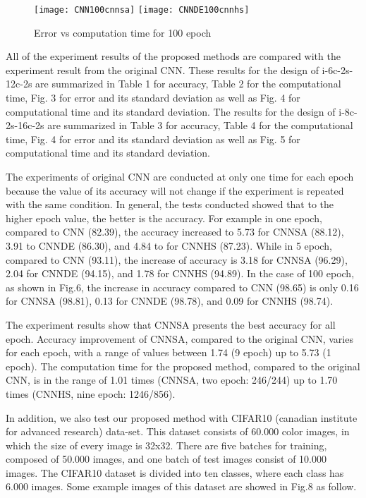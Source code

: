 \documentclass[10pt,letterpaper]{article}
\begin{document}
\begin{figure}
    \texttt{[image: CNN100cnnsa]}
    \texttt{[image: CNNDE100cnnhs]}
    \caption{Error vs computation time for 100 epoch}
    \label{fig:my_label}
\end{figure}


All of the experiment results of the proposed methods are compared with the experiment result from the original CNN. These results for the design of i-6c-2s-12c-2s are summarized in Table 1 for accuracy, Table 2 for the computational time, Fig. 3 for error and its standard deviation as well as Fig. 4 for computational time and its standard deviation. The results for the design of i-8c-2s-16c-2s are summarized in Table 3 for accuracy, Table 4 for the computational time, Fig. 4 for error and its standard deviation as well as Fig. 5 for computational time and its standard deviation. 

The experiments of original CNN are conducted at only one time for each epoch because the value of its accuracy will not change if the experiment is repeated with the same condition. In general, the tests conducted showed that to the higher epoch value, the better is the accuracy. For example in one epoch, compared to CNN (82.39), the accuracy increased to 5.73 for CNNSA (88.12), 3.91 to CNNDE (86.30), and 4.84 to for CNNHS (87.23). While in 5 epoch, compared to CNN (93.11), the increase of accuracy is 3.18 for CNNSA (96.29), 2.04 for CNNDE (94.15), and 1.78 for CNNHS (94.89). In the case of 100 epoch, as shown in Fig.6, the increase in accuracy compared to CNN (98.65) is only 0.16 for CNNSA (98.81), 0.13 for CNNDE (98.78), and 0.09 for CNNHS (98.74). 

The experiment results show that CNNSA presents the best accuracy for all epoch. Accuracy improvement of CNNSA, compared to the original CNN, varies for each epoch, with a range of values between 1.74 (9 epoch) up to 5.73 (1 epoch). The computation time for the proposed method, compared to the original CNN, is in the range of 1.01 times (CNNSA, two epoch: 246/244) up to 1.70 times (CNNHS, nine epoch: 1246/856).

In addition, we also test our proposed method with CIFAR10 (canadian institute for advanced research)  data-set. This dataset consists of 60.000 color images, in which the size of every image is 32x32. There are five batches for training, composed of 50.000 images, and one batch of test images consist of 10.000 images. The CIFAR10 dataset is divided into ten classes, where each class has 6.000 images. Some example images of this dataset are showed in Fig.8 as follow.
\end{document}
